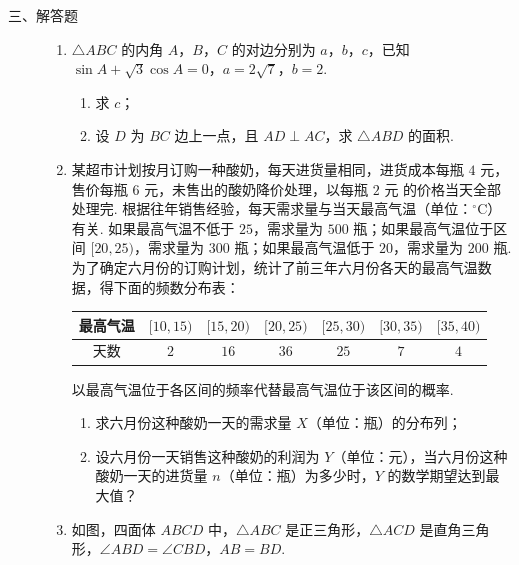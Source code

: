 \begin{description}

    \item[三、解答题]

    \begin{enumerate}[leftmargin=5pt]

      \addtocounter{enumi}{+16}

        \item \(\triangle ABC\) 的内角 \(A\)，\(B\)，\(C\) 的对边分别为 \(a\)，\(b\)，\(c\)，已知 \(\sin A+\sqrt3\cos A=0\)，\(a=2\sqrt7\)，\(b=2\).

\begin{enumerate}
\item 求 \(c\)；
\item 设 \(D\) 为 \(BC\) 边上一点，且 \(AD\perp AC\)，求 \(\triangle ABD\) 的面积.
\end{enumerate}

        \item 某超市计划按月订购一种酸奶，每天进货量相同，进货成本每瓶 \(4\text{ 元}\)，售价每瓶 \(6\text{ 元}\)，未售出的酸奶降价处理，以每瓶 \(2\text{ 元}\) 的价格当天全部处理完. 根据往年销售经验，每天需求量与当天最高气温（单位：\(^{\circ}\mathrm{C}\)）有关. 如果最高气温不低于 \(25\)，需求量为 \(500\text{ 瓶}\)；如果最高气温位于区间 \([20,25)\)，需求量为 \(300\text{ 瓶}\)；如果最高气温低于 \(20\)，需求量为 \(200\text{ 瓶}\). 为了确定六月份的订购计划，统计了前三年六月份各天的最高气温数据，得下面的频数分布表：

\begin{center}
\begin{tabular}{c|cccccc}
最高气温 & \([10,15)\) & \([15,20)\) & \([20,25)\) & \([25,30)\) & \([30,35)\) & \([35,40)\) \\
\hline
天数 & \(2\) & \(16\) & \(36\) & \(25\) & \(7\) & \(4\)
\end{tabular}
\end{center}

以最高气温位于各区间的频率代替最高气温位于该区间的概率.

\begin{enumerate}
\item 求六月份这种酸奶一天的需求量 \(X\)（单位：瓶）的分布列；
\item 设六月份一天销售这种酸奶的利润为 \(Y\)（单位：元），当六月份这种酸奶一天的进货量 \(n\)（单位：瓶）为多少时，\(Y\) 的数学期望达到最大值？
\end{enumerate}

        \item 如图，四面体 \(ABCD\) 中，\(\triangle ABC\) 是正三角形，\(\triangle ACD\) 是直角三角形，\(\angle ABD=\angle CBD\)，\(AB=BD\).


\end{enumerate}
\end{description}
